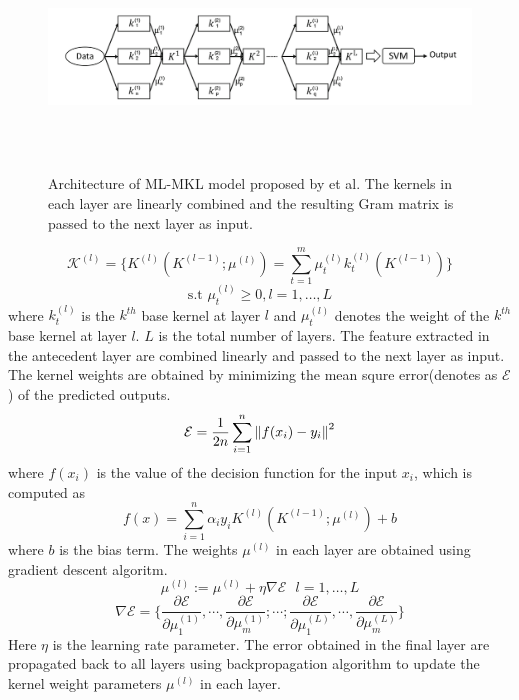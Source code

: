 \begin{figure}
  \centering
  \captionsetup{justification=centering,margin=0.1cm}
  \includegraphics[width=1\textwidth,height=6cm]{figures/back_prop_mlmkl}
  \caption{Architecture of ML-MKL model proposed by \cite{deep_mkl} et al. The kernels in each layer are linearly combined and the resulting Gram matrix is passed to the next layer as input.}
  \label{fig_deep_mkl}
\end{figure}

\[ \mathcal{K}^{(l)} = \big\{ K^{(l)}(K^{(l-1)}; \mu^{(l)}) = \sum_{t=1}^m \mu_t^{(l)} k_t^{(l)}(K^{(l-1)})  \big\} \]
\[ \textrm{s.t } \mu_t^{(l)} \geq 0, l = 1, \ldots, L \]
where $k_t^{(l)}$ is the $k^{th}$ base kernel at layer $l$ and $\mu_t^{(l)}$ denotes the weight of the $k^{th}$ base kernel at layer $l$. $L$ is the total number of layers. The feature extracted in the antecedent layer are combined linearly and passed to the next layer as input. The kernel weights are obtained by minimizing the mean squre error(denotes as $\mathcal{E}$) of the predicted outputs.
\[ \mathcal{E} = \frac{1}{2n} \sum_{i=1}^n \left\lVert f(x_i) - y_i\right\rVert^2 \]
where $f(x_i)$ is the value of the decision function for the input $x_i$, which is computed as
\[ f(x) = \sum_{i=1}^n \alpha_i y_i K^{(l)}(K^{(l-1)}; \mu^{(l)}) + b \]
where $b$ is the bias term. The weights $\mu^{(l)}$ in each layer are obtained using gradient descent algoritm.
\[ \mu^{(l)} := \mu^{(l)} + \eta \nabla \mathcal{E}  \textrm{ } l = 1, \ldots, L \]
\[ \nabla \mathcal{E} = \Bigg\{ \frac{\partial \mathcal{E}}{\partial \mu_1^{(1)}}, \cdots, \frac{\partial \mathcal{E}}{\partial \mu_m^{(1)}}; \cdots; \frac{\partial \mathcal{E}}{\partial \mu_1^{(L)}}, \cdots, \frac{\partial \mathcal{E}}{\partial \mu_m^{(L)}}  \Bigg\}  \]
Here $\eta$ is the learning rate parameter. The error obtained in the final layer are propagated back to all layers using backpropagation algorithm to update the kernel weight parameters $\mu^{(l)}$ in each layer.

